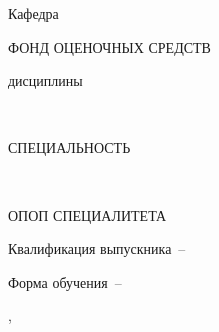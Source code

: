 

\thispagestyle{empty}%
\begin{center}%
\MakeUppercase{\Ministry}
\end{center}%
%
\begin{center}%
\OrganizationNameFirst
\par
\OrganizationNameSecond
\end{center}%

\begin{center}%
Кафедра ~\AuthorDepartment
\end{center}%

\vspace{0pt plus32fill} 
\begin{center}%
{\large ФОНД ОЦЕНОЧНЫХ СРЕДСТВ}\par
дисциплины \par
\textbf{\DisciplineCode}~\MakeUppercase{\DisciplineName}
\end{center}%

\vspace{0pt plus6fill} 
\begin{center}%
{\large СПЕЦИАЛЬНОСТЬ}\par
\textbf{\SpecialityCode}~\MakeUppercase{\SpecialityName}
\end{center}%

\vspace{0pt plus6fill} 
\begin{center}%
{\large ОПОП СПЕЦИАЛИТЕТА}\par
\MakeUppercase{\SpecialityOPOP}
\end{center}%

%
\vspace{0pt plus4fill} %
\begin{center}%
Квалификация выпускника~--~\Qualification\par
Форма обучения~--~\FormOfStudy
\end{center}%
%
\vspace{0pt plus4fill} 
\begin{center}%
{\MakeUppercase{\City},~\YearOfDocument}
\end{center}%
\newpage
